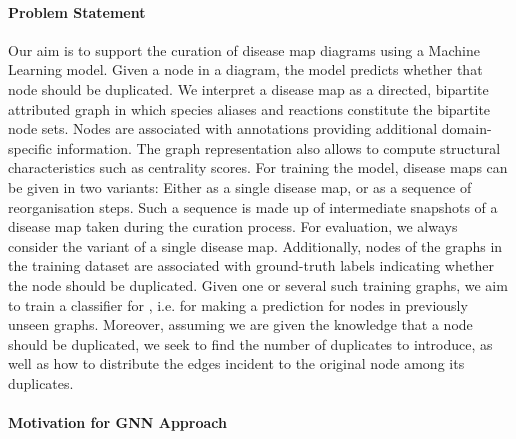 \documentclass[
	fontsize=10pt, %
	twoside=false, %
	secnumdepth=1, %
  toc=indentunnumbered %
]{kaobook}
\begin{document}
\paragraph{Problem Statement} 
Our aim is to support the curation of disease map diagrams using a Machine
Learning model. Given a node in a diagram, the model predicts whether that node
should be duplicated.
%
We interpret a disease map as a directed, bipartite attributed graph in which
species aliases and reactions constitute the bipartite node sets. Nodes are
associated with annotations providing additional domain-specific information.
The graph representation also allows to compute structural characteristics such
as centrality scores.
%
For training the model, disease maps can be given in two variants: Either as a
single disease map, or as a sequence of reorganisation steps. Such a sequence is
made up of intermediate snapshots of a disease map taken during the curation
process. For evaluation, we always consider the variant of a single disease map.
%
Additionally, nodes of the graphs in the training dataset are associated with
ground-truth labels indicating whether the node should be duplicated. Given one
or several such training graphs, we aim to train a classifier for , i.e. for making a prediction for nodes in previously
unseen graphs.
%
Moreover, assuming we are given the knowledge that a node should be duplicated,
we seek to find the number of duplicates to introduce, as well as how to
distribute the edges incident to the original node among its duplicates.


\paragraph{Motivation for GNN Approach}
\end{document}
